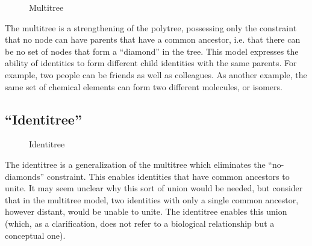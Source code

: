 \documentclass[pra,twocolumn,groupedaddress,10pt]{revtex4}
\theoremstyle{definition}
\begin{document}
\begin{figure}[htp]
\centering
{}
\caption{\label{fig:multitree}Multitree}
\end{figure}

The multitree\cite{multitree} is a strengthening of the polytree, possessing only the constraint that no node can have parents that have a common ancestor, i.e. that there can be no set of nodes that form a ``diamond'' in the tree. This model expresses the ability of identities to form different child identities with the same parents. For example, two people can be friends as well as colleagues. As another example, the same set of chemical elements can form two different molecules, or isomers.

\subsection{``Identitree''} \label{sec:identitree}

\begin{figure}[htp]
\centering
{}
\caption{\label{fig:identitree}Identitree}
\end{figure}

The identitree is a generalization of the multitree which eliminates the ``no-diamonds'' constraint. This enables identities that have common ancestors to unite. It may seem unclear why this sort of union would be needed, but consider that in the multitree model, two identities with only a single common ancestor, however distant, would be unable to unite. The identitree enables this union (which, as a clarification, does not refer to a biological relationship but a conceptual one).
\end{document}
